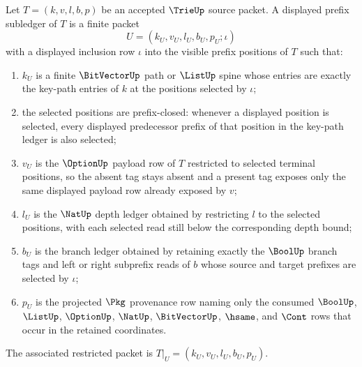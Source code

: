 \begin{definition}\label{def:trie-displayed-prefix-subledger}
Let $T=(k,v,l,b,p)$ be an accepted $\TrieUp$ source packet. A displayed prefix subledger of $T$ is a finite packet
$$
U=(k_U,v_U,l_U,b_U,p_U;\iota)
$$
with a displayed inclusion row $\iota$ into the visible prefix positions of $T$ such that:
\begin{enumerate}
\item $k_U$ is a finite $\BitVectorUp$ path or $\ListUp$ spine whose entries are exactly the key-path entries of $k$ at the positions selected by $\iota$;
\item the selected positions are prefix-closed: whenever a displayed position is selected, every displayed predecessor prefix of that position in the key-path ledger is also selected;
\item $v_U$ is the $\OptionUp$ payload row of $T$ restricted to selected terminal positions, so the absent tag stays absent and a present tag exposes only the same displayed payload row already exposed by $v$;
\item $l_U$ is the $\NatUp$ depth ledger obtained by restricting $l$ to the selected positions, with each selected read still below the corresponding depth bound;
\item $b_U$ is the branch ledger obtained by retaining exactly the $\BoolUp$ branch tags and left or right subprefix reads of $b$ whose source and target prefixes are selected by $\iota$;
\item $p_U$ is the projected $\Pkg$ provenance row naming only the consumed $\BoolUp$, $\ListUp$, $\OptionUp$, $\NatUp$, $\BitVectorUp$, $\hsame$, and $\Cont$ rows that occur in the retained coordinates.
\end{enumerate}
The associated restricted packet is $T|_U=(k_U,v_U,l_U,b_U,p_U)$.
\end{definition}

